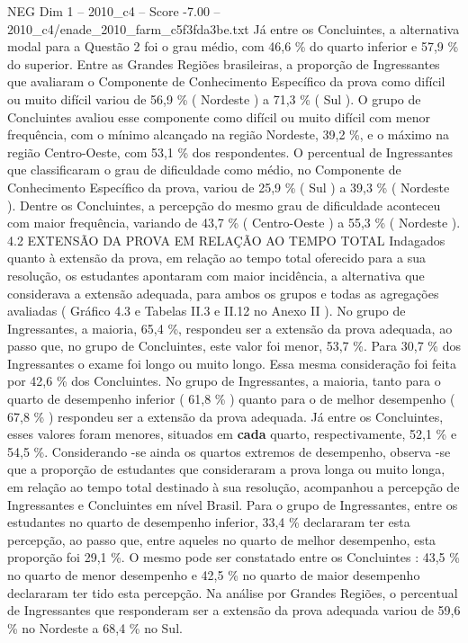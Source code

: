 \begin{textsample}{NEG Dim 1 – 2010\_c4 – Score -7.00 – 2010\_c4/enade\_2010\_farm\_c5f3fda3be.txt}
Já entre os Concluintes, a alternativa modal para a Questão 2 foi o grau médio, com 46,6 \% do quarto inferior e 57,9 \% do superior.
Entre as Grandes Regiões brasileiras, a proporção de Ingressantes que avaliaram o Componente de Conhecimento Específico da prova como difícil ou muito difícil variou de 56,9 \% ( Nordeste ) a 71,3 \% ( Sul ).
O grupo de Concluintes avaliou esse componente como difícil ou muito difícil com menor frequência, com o mínimo alcançado na região Nordeste, 39,2 \%, e o máximo na região Centro-Oeste, com 53,1 \% dos respondentes.
O percentual de Ingressantes que classificaram o grau de dificuldade como médio, no Componente de Conhecimento Específico da prova, variou de 25,9 \% ( Sul ) a 39,3 \% ( Nordeste ).
Dentre os Concluintes, a percepção do mesmo grau de dificuldade aconteceu com maior frequência, variando de 43,7 \% ( Centro-Oeste ) a 55,3 \% ( Nordeste ). 4.2 EXTENSÃO DA PROVA EM RELAÇÃO AO TEMPO TOTAL Indagados quanto à extensão da prova, em relação ao tempo total oferecido para a sua resolução, os estudantes apontaram com maior incidência, a alternativa que considerava a extensão adequada, para ambos os grupos e todas as agregações avaliadas ( Gráfico 4.3 e Tabelas II.3 e II.12 no Anexo II ).
No grupo de Ingressantes, a maioria, 65,4 \%, respondeu ser a extensão da prova adequada, ao passo que, no grupo de Concluintes, este valor foi menor, 53,7 \%.
Para 30,7 \% dos Ingressantes o exame foi longo ou muito longo.
Essa mesma consideração foi feita por 42,6 \% dos Concluintes.
No grupo de Ingressantes, a maioria, tanto para o quarto de desempenho inferior ( 61,8 \% ) quanto para o de melhor desempenho ( 67,8 \% ) respondeu ser a extensão da prova adequada.
Já entre os Concluintes, esses valores foram menores, situados em \textbf{cada} quarto, respectivamente, 52,1 \% e 54,5 \%.
Considerando -se ainda os quartos extremos de desempenho, observa -se que a proporção de estudantes que consideraram a prova longa ou muito longa, em relação ao tempo total destinado à sua resolução, acompanhou a percepção de Ingressantes e Concluintes em nível Brasil.
Para o grupo de Ingressantes, entre os estudantes no quarto de desempenho inferior, 33,4 \% declararam ter esta percepção, ao passo que, entre aqueles no quarto de melhor desempenho, esta proporção foi 29,1 \%.
O mesmo pode ser constatado entre os Concluintes : 43,5 \% no quarto de menor desempenho e 42,5 \% no quarto de maior desempenho declararam ter tido esta percepção.
Na análise por Grandes Regiões, o percentual de Ingressantes que responderam ser a extensão da prova adequada variou de 59,6 \% no Nordeste a 68,4 \% no Sul.

\end{textsample}
